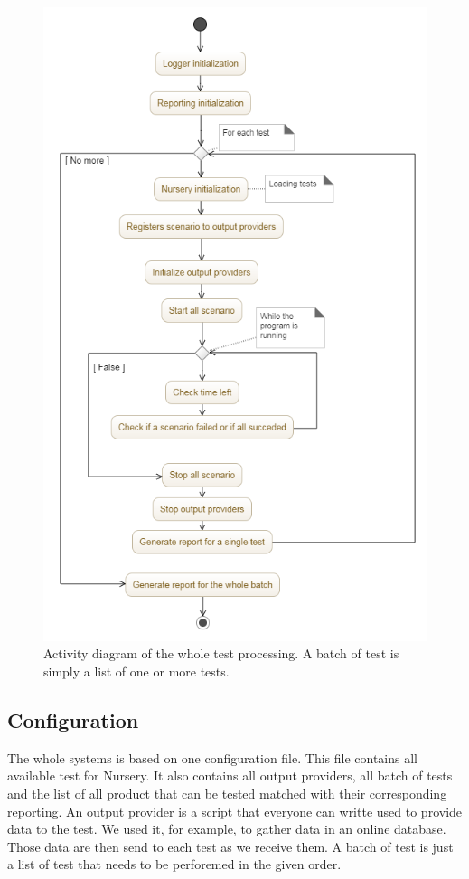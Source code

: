 \documentclass[12pt]{article}
\begin{document}
\begin{figure}
    \centering
    \includegraphics[scale=0.5]{activity_diagram.png}
    \caption{Activity diagram of the whole test processing. A batch of test is simply a list of one or more tests.}
    \label{activity_diagram}
\end{figure}

\subsection{Configuration}

The whole systems is based on one configuration file. This file contains all available test for Nursery. It also contains all output providers, all batch of tests and the list of all product that can be tested matched with their corresponding reporting. An output provider is a script that everyone can writte used to provide data to the test. We used it, for example, to gather data in an online database. Those data are then send to each test as we receive them. A batch of test is just a list of test that needs to be perforemed in the given order.\\
\end{document}
